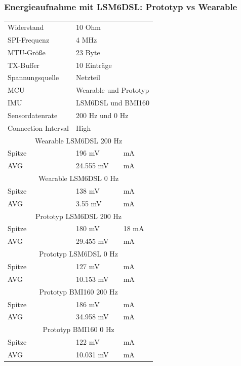 \subsubsection{Energieaufnahme mit LSM6DSL: Prototyp vs Wearable}
\begin{minipage}{\linewidth}
	\label{tab:aaaaaaaaaaaaaaaa}
	\begin{tabularx}{\linewidth}{|l|l|X|}
		Widerstand & \multicolumn{2}{l|}{10 Ohm}\\
    SPI-Frequenz & \multicolumn{2}{l|}{4 MHz}\\
    MTU-Größe & \multicolumn{2}{l|}{23 Byte}\\
    TX-Buffer & \multicolumn{2}{l|}{10 Einträge}\\
    Spannungsquelle & \multicolumn{2}{l|}{Netzteil}\\
    MCU & \multicolumn{2}{l|}{Wearable und Prototyp}\\
    IMU & \multicolumn{2}{l|}{LSM6DSL und BMI160}\\
    Sensordatenrate & \multicolumn{2}{l|}{200 Hz und 0 Hz}\\
    Connection Interval & \multicolumn{2}{l|}{High}\\
    \hline
    \multicolumn{3}{c}{Wearable LSM6DSL 200 Hz}\\
    Spitze & 196 mV & mA\\
    AVG & 24.555 mV & mA\\
    \hline
    \multicolumn{3}{c}{Wearable LSM6DSL 0 Hz}\\
    Spitze & 138 mV & mA\\
    AVG & 3.55 mV & mA\\
    \hline
    \multicolumn{3}{|c|}{Prototyp LSM6DSL 200 Hz}\\
    Spitze & 180 mV & 18 mA\\
    AVG & 29.455 mV & mA\\
    \hline
    \multicolumn{3}{|c|}{Prototyp LSM6DSL 0 Hz}\\
    Spitze & 127 mV & mA\\
    AVG & 10.153 mV & mA\\
    \hline
    \multicolumn{3}{|c|}{Prototyp BMI160 200 Hz}\\
    Spitze & 186 mV & mA\\
    AVG & 34.958 mV & mA\\
    \hline
    \multicolumn{3}{|c|}{Prototyp BMI160 0 Hz}\\
    Spitze & 122 mV & mA\\
    AVG & 10.031 mV & mA\\
  \end{tabularx}
\end{minipage}\\\\

